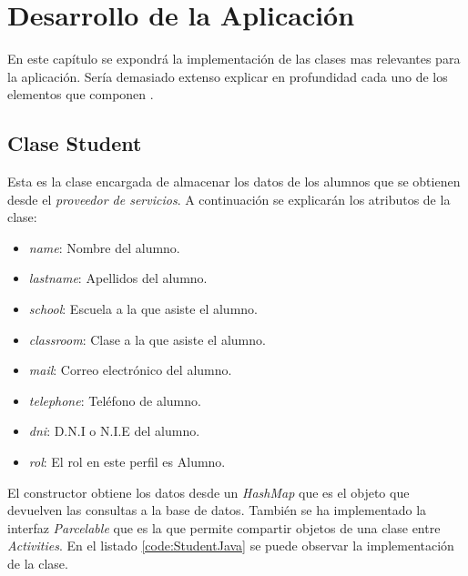 %
%
%
%

\cleardoublepage
\chapter{Desarrollo de la Aplicación}
\label{chap:developing}

	En este capítulo se expondrá la implementación de las clases mas relevantes para la aplicación.
	Sería demasiado extenso explicar en profundidad cada uno de los elementos que componen \CollegeApp.
	
	\section{Clase Student}
	
		Esta es la clase encargada de almacenar los datos de los alumnos que se obtienen desde el {\it proveedor de servicios}.
		A continuación se explicarán los atributos de la clase:
		
		\begin{itemize}
			\item {\it name}: Nombre del alumno.
			\item {\it lastname}: Apellidos del alumno.
			\item {\it school}: Escuela a la que asiste el alumno.
			\item {\it classroom}: Clase a la que asiste el alumno.
			\item {\it mail}: Correo electrónico del alumno.
			\item {\it telephone}: Teléfono de alumno.
			\item {\it dni}: D.N.I o N.I.E del alumno.
			\item {\it rol}: El rol en este perfil es Alumno.
		\end{itemize}
		
		El constructor obtiene los datos desde un {\it HashMap}\cite{10:hashmap:online} que es el objeto que devuelven las consultas a la base de datos. También se ha implementado la interfaz {\it Parcelable}\cite{11:parcelable:online} que es la que permite compartir objetos de una clase entre {\it Activities}. 
		En el listado \ref{code:StudentJava} se puede observar la implementación de la clase.
		
		
	
